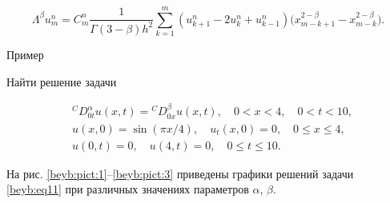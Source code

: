 \[

\Lambda ^\beta u_m^n =C_m^n \frac{1}{\Gamma (3-\beta )h^2 

}\sum\limits_{k=1}^m {\left( {u_{k+1}^n -2u_k^n +u_{k-1}^{n} } \right)} 

\bigl( {x_{m-k+1}^{2-\beta} -x_{m-k}^{2-\beta} } \bigr).

\]



\begin{newthm}{Пример}

Найти решение задачи

\begin{equation}

\label{beyb:eq11}

\begin{aligned}

&{}^CD_{0t}^\alpha u(x,t)={}^CD_{0x}^\beta u(x,t),\quad 0<x<4, \quad 0<t<10, \\

&u(x, 0)=\sin ( {\pi x}/{4}),\quad u_t (x, 0)=0,\quad 0\le x\le 4, \\

&u(0, t)=0,\quad u(4, t)=0,\quad 0\le t\le 10.

\end{aligned}

\end{equation}

\end{newthm}



На рис. \ref{beyb:pict:1}--\ref{beyb:pict:3} приведены графики решений задачи \eqref{beyb:eq11} при различных значениях параметров $\alpha$, $\beta$.




%







